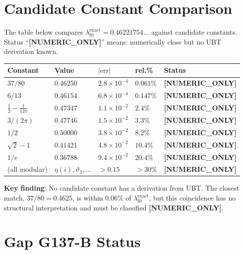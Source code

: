 \documentclass[12pt,a4paper]{article}
\theoremstyle{definition}
\theoremstyle{remark}
\newcommand{\NUMONLY}{\textcolor{red!50!black}{\textbf{[NUMERIC\_ONLY]}}}
\begin{document}
\section{Candidate Constant Comparison}
\label{sec:candidates}

The table below compares $\lambda_{\mathrm{fit}}^{\mathrm{exact}} = 0.46221754\ldots$
against candidate constants.  Status ``\NUMONLY'' means: numerically close but
no UBT derivation known.

\begin{center}
\begin{tabular}{@{}lllll@{}}
\toprule
Constant & Value & $|\text{err}|$ & rel.\% & Status \\
\midrule
$37/80$ & $0.46250$ & $2.8\times10^{-4}$ & $0.061\%$ & \NUMONLY \\
$6/13$ & $0.46154$ & $6.8\times10^{-4}$ & $0.147\%$ & \NUMONLY \\
$\tfrac{1}{2} - \tfrac{1}{12\pi}$ & $0.47347$ & $1.1\times10^{-2}$ & $2.4\%$ & \NUMONLY \\
$3/(2\pi)$ & $0.47746$ & $1.5\times10^{-2}$ & $3.3\%$ & \NUMONLY \\
$1/2$ & $0.50000$ & $3.8\times10^{-2}$ & $8.2\%$ & \NUMONLY \\
$\sqrt{2}-1$ & $0.41421$ & $4.8\times10^{-2}$ & $10.4\%$ & \NUMONLY \\
$1/e$ & $0.36788$ & $9.4\times10^{-2}$ & $20.4\%$ & \NUMONLY \\
(all modular) & $\eta(i), \vartheta_3,\ldots$ & $>0.15$ & $>30\%$ & \NUMONLY \\
\bottomrule
\end{tabular}
\end{center}

\begin{warnbox}
\textbf{Key finding}: No candidate constant has a derivation from UBT.
The closest match, $37/80 = 0.4625$, is within $0.06\%$ of
$\lambda_{\mathrm{fit}}^{\mathrm{exact}}$, but this coincidence has no
structural interpretation and must be classified \NUMONLY{}.
\end{warnbox}

\section{Gap G137-B Status}
\label{sec:gap}
\end{document}
